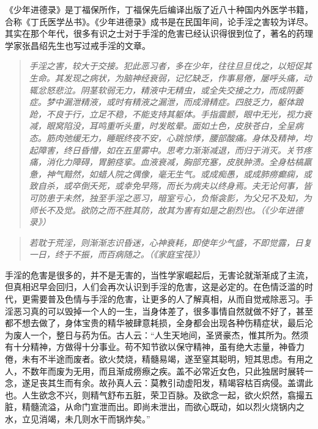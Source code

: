 《少年进德录》是丁福保所作，丁福保先后编译出版了近八十种国内外医学书籍，合称《丁氏医学丛书》。《少年进德录》成书是在民国年间，论手淫之害较为详尽。其实在那个年代，很多有识之士对于手淫的危害已经认识得很到位了，著名的药理学家张昌绍先生也写过戒手淫的文章。

\begin{quote}\it
    手淫之害，较大于交接。犯此恶习者，多在少年，往往旦旦伐之，以短促其生命。其发现之病状，为脑神经衰弱，记忆缺乏，作事易倦，屡呼头痛，动辄忿怒悲泣。阴茎软弱无力，精液中无精虫，或全失交接之力，而成阴萎症。梦中漏泄精液，或时有精液之漏泄，而成滑精症。四肢乏力，躯体踉跄，不良于行，立足不稳，不能支持其躯体。手指震颤，眼中无光，视力衰减，眼窝陷没，耳鸣重听头重，时发眩晕。面如土色，皮肤苍白，全呈病态。筋肉弛缓无力，睡眠终夜不安，心跳惊悸，腰部酸痛。身体及精神，均起障害，终日昏懵，如在五里雾中。思考力渐渐减退，而归于消灭。关节疼痛，消化力障碍，胃腑痉挛。血液衰减，胸部充塞，皮肤肿溃。全身枯槁羸惫，神气黯然，如蜡人院之偶像，毫无生气。或成痴愚，或成肺痨癫痫，或致自杀，或卒倒夭死，或幸免早殇，而长为病夫以终身焉。夫无论何事，皆可防患于未然，独至手淫之恶习，暗室亏心，负惭衾影，为父兄不及知，为师长不及觉。欲防之而不胜其防，故其为害有如是之剧烈也。（《少年进德录》）
\end{quote}

\begin{quote}\it
    若耽于荒淫，则渐渐志识昏迷，心神衰耗，即使年少气盛，不即觉露，日复一日，终于不振，而百病随之。（《家庭宝筏》）
\end{quote}

手淫的危害是很多的，并不是无害的，当性学家崛起后，无害论就渐渐成了主流，但真相迟早会回归，人们会再次认识到手淫的危害，这是必定的。在色情泛滥的时代，更需要普及色情与手淫的危害，让更多的人了解真相，从而自觉戒除恶习。手淫恶习真的可以毁掉一个人的一生，当身体差了，很多事情自然就做不好了，甚至都不想去做了，身体宝贵的精华被肆意耗损，全身都会出现各种伤精症状，最后沦为废人一个，整日与药为伍。古人云：“人生天地间，圣贤豪杰，惟其所为。然须有十分精神，方做得十分事业。苟不知节欲以保守精神，虽有绝大志量，神昏力倦，未有不半途而废者。欲火焚烧，精髓易竭，遂至窒其聪明，短其思虑。有用之人，不数年而废为无用，而且渐成痨瘵之疾。盖不必常近女色，只此独居时展转一念，遂足丧其生而有余。故孙真人云：莫教引动虚阳发，精竭容枯百病侵。盖谓此也。人生欲念不兴，则精气舒布五脏，荣卫百脉。及欲念一起，欲火炽然，翕撮五脏，精髓流溢，从命门宣泄而出。即尚未泄出，而欲心既动，如以烈火烧锅内之水，立见消竭，未几则水干而锅炸矣。”

